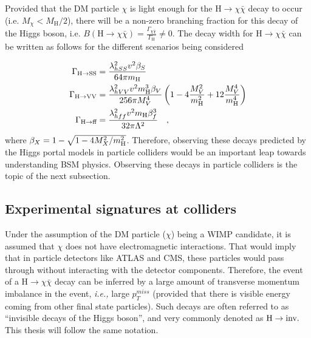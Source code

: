 Provided that the DM particle $\chi$ is light enough for the $\textrm{H} \rightarrow \chi \bar{\chi}$ decay to occur (i.e. $M_{\chi} < M_{\textrm{H}} / 2$), there will be a non-zero
branching fraction for this decay of the Higgs boson, i.e. $B(\textrm{H} \rightarrow \chi \bar{\chi}) = \frac{\Gamma_{\chi\bar{\chi}}}{\Gamma_{\textrm{H}}} \neq 0$. The decay width for
$\textrm{H} \rightarrow \chi \bar{\chi}$ can be written as follows for the different scenarios being considered~\cite{Djouadi:2011aa}

\begin{equation}
    \begin{split}
        \Gamma_{\textrm{H} \rightarrow \textrm{SS}} &= \frac{\lambda_{hSS}^{2} v^{2} \beta_{S}}{64 \pi m_{\textrm{H}}} \\
        \Gamma_{\textrm{H} \rightarrow \textrm{VV}} &= \frac{\lambda_{hVV}^{2} v^{2} m_{\textrm{H}}^{3} \beta_{V}}{256 \pi M_{V}^{4}} \left( 1 - 4 \frac{M_V^2}{m_{\textrm{H}}^2} + 12 \frac{M_V^4}{m_{\textrm{H}}^4} \right) \\
        \Gamma_{\textrm{H} \rightarrow \textrm{ff}} &= \frac{\lambda_{hff}^{2} v^{2} m_{\textrm{H}} \beta_{f}^{3}}{32 \pi \Lambda^{2}} \quad ,
    \end{split}
\end{equation}
where $\beta_{X} = 1 - \sqrt{1 - 4 M_X^2 / m_{\textrm{H}}^2}$. 
Therefore, observing these decays predicted by the Higgs portal models in particle colliders would be an important
leap towards understanding BSM physics. Observing these decays in particle colliders is the topic of the next subsection.

\subsection{Experimental signatures at colliders}
\label{subsec:exp_signatures}

Under the assumption of the DM particle ($\chi$) being a WIMP candidate, it is assumed that $\chi$ does not have electromagnetic interactions. That would imply
that in particle detectors like ATLAS and CMS, these particles would pass through without interacting with the detector components. Therefore, the event of a
$\textrm{H} \rightarrow \chi \bar{\chi}$ decay can be inferred by a large amount of transverse momentum imbalance in the event, \textit{i.e.,} large $p_T^{miss}$ (provided that there
is visible energy coming from other final state particles). Such decays are often referred to as ``invisible decays of the Higgs boson'', and very
commonly denoted as $\textrm{H} \rightarrow \textrm{inv.}$ This thesis will follow the same notation.

